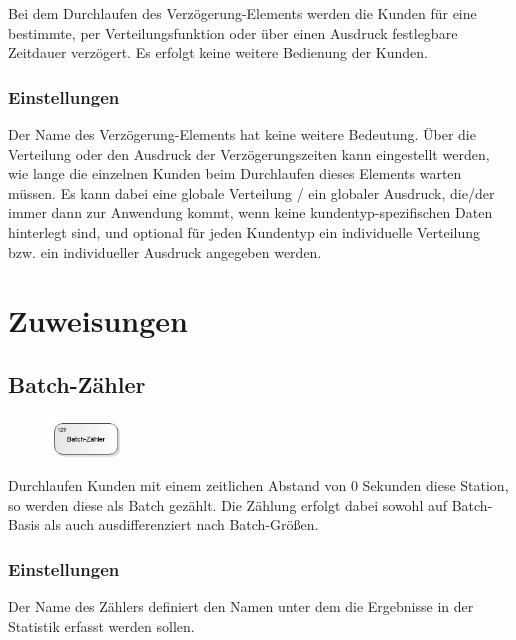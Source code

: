 Bei dem Durchlaufen des Verzögerung-Elements werden die Kunden für eine bestimmte, per Verteilungsfunktion oder über
einen Ausdruck festlegbare Zeitdauer verzögert. Es erfolgt keine weitere Bedienung der Kunden.

\subsection*{Einstellungen}

Der Name des Verzögerung-Elements hat keine weitere Bedeutung. Über die Verteilung oder den Ausdruck der Verzögerungszeiten kann
eingestellt werden, wie lange die einzelnen Kunden beim Durchlaufen dieses Elements warten müssen.
Es kann dabei eine globale Verteilung / ein globaler Ausdruck, die/der immer dann zur Anwendung kommt, wenn keine
kundentyp-spezifischen Daten hinterlegt sind, und optional für jeden Kundentyp ein individuelle
Verteilung bzw. ein individueller Ausdruck angegeben werden.





\chapter{Zuweisungen}

\section{Batch-Zähler}
\label{ref:ModelElementCounterBatch}

\begin{figure}
\vspace{-22pt}
\includegraphics[width=2cm]{imageModelElementCounterBatch.png}
\vspace{-22pt}
\end{figure}

Durchlaufen Kunden mit einem zeitlichen Abstand von 0 Sekunden diese Station, so werden diese
als Batch gezählt. Die Zählung erfolgt dabei sowohl auf Batch-Basis als auch ausdifferenziert
nach Batch-Größen.

\subsection*{Einstellungen}

Der Name des Zählers definiert den Namen unter dem die Ergebnisse in der Statistik erfasst werden sollen.


